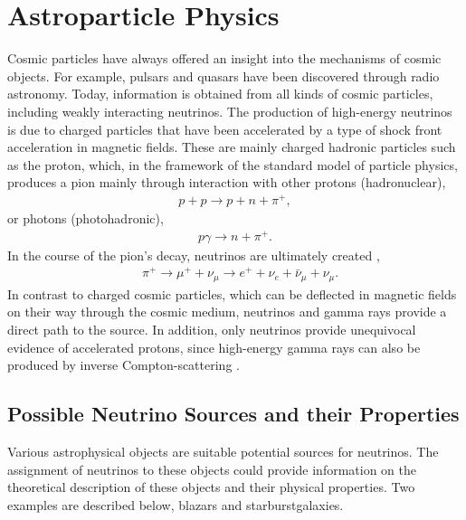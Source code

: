 \chapter{Astroparticle Physics} \label{sec:astro}

Cosmic particles have always offered an insight into the mechanisms of cosmic objects.
For example, pulsars and quasars have been discovered through radio astronomy.
Today, information is obtained from all kinds of cosmic particles, including weakly interacting neutrinos.
The production of high-energy neutrinos is due to charged particles that have been accelerated by a type of shock front acceleration in magnetic fields.
These are mainly charged hadronic particles such as the proton, which, in the framework of the standard model of particle physics, produces a pion mainly through interaction with other protons (hadronuclear),
\begin{align}
  p+p \rightarrow p+n+\pi^+,
\end{align}
or photons (photohadronic),
\begin{align}
  p\gamma \rightarrow n+\pi^+.
\end{align}
In the course of the pion's decay, neutrinos are ultimately created \cite{pdg},
\begin{align}
  &\pi^+ \rightarrow \mu^++\nu_\mu \rightarrow e^++\nu_e+\bar{\nu}_\mu+\nu_\mu.
\end{align}
In contrast to charged cosmic particles, which can be deflected in magnetic fields on their way through the cosmic medium, neutrinos and gamma rays provide a direct path to the source.
In addition, only neutrinos provide unequivocal evidence of accelerated protons, since high-energy gamma rays can also be produced by inverse Compton-scattering \cite{spiering}.


\section{Possible Neutrino Sources and their Properties}

Various astrophysical objects are suitable potential sources for neutrinos.
The assignment of neutrinos to these objects could provide information on the theoretical description of these objects and their physical properties.
Two examples are described below, blazars and starburstgalaxies.

